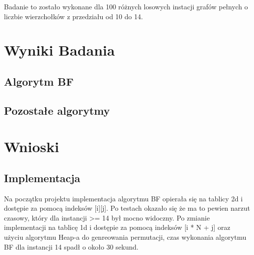 \documentclass[a4paper,12pt]{article}
\begin{document}
Badanie to zostało wykonane dla 100 różnych losowych instacji grafów pełnych o liczbie wierzchołków z przedziału od 10 do 14.


\section{Wyniki Badania}

\subsection{Algorytm BF}

\subsection{Pozostałe algorytmy}

\section{Wnioski}

\subsection{Implementacja}
Na początku projektu implementacja algorytmu BF opierała się na tablicy 2d i dostępie za pomocą indeksów [i][j].
Po testach okazało się że ma to pewien narzut czasowy, który dla instancji >= 14 był mocno widoczny.
Po zmianie implementacji na tablicę 1d i dostępie za pomocą indeksów [i * N + j] oraz użyciu algorytmu Heap-a do genreowania permutacji,
czas wykonania algorytmu BF dla instancji 14 spadł o około 30 sekund.   
\end{document}
